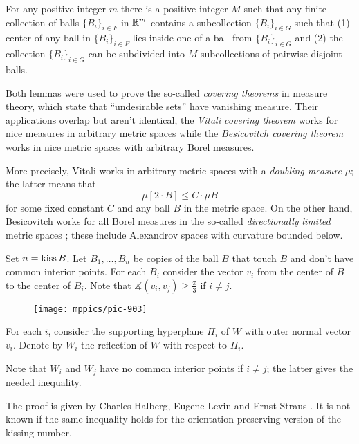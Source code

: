 \begin{pr}
For any positive integer $m$ there is a positive integer $M$ such that 
any finite collection of balls $\{B_i\}_{i\in F}$ in $\mathbb{R}^m$ 
contains a subcollection $\{B_i\}_{i\in G}$
such that (1) center of any ball in $\{B_i\}_{i\in F}$ lies inside one of a ball from $\{B_i\}_{i\in G}$
and (2) the collection $\{B_i\}_{i\in G}$ can be subdivided into $M$ subcollections of pairwise disjoint balls.
\end{pr}

Both lemmas were used to prove the so-called \emph{covering theorems} in measure theory,
which state that ``undesirable sets'' have vanishing measure.
Their applications overlap but aren't identical, the \emph{Vitali covering theorem} works for nice measures in arbitrary metric spaces while the \emph{Besicovitch covering theorem} works in nice metric spaces with arbitrary Borel measures.

More precisely, Vitali works in arbitrary metric spaces with a \emph{doubling measure} $\mu$;
the latter means that 
\[\mu [2\cdot B]\le C\cdot \mu B\] 
for some fixed constant $C$ and any ball $B$ in the metric space.
On the other hand, Besicovitch works for all Borel measures in the so-called \emph{directionally limited} metric spaces \cite[see 2.8.9 in][]{federer};
these include Alexandrov spaces with curvature bounded below.






Set $n=\mathop{\rm kiss} B$.
Let $B_1,\dots, B_n$ be copies of the ball $B$ that touch $B$ and don't have common interior points.
For each $B_i$ consider the vector $v_i$ from the center of $B$ to the center of $B_i$.
Note that $\measuredangle(v_i,v_j)\ge \tfrac\pi3$ if $i\ne j$.

\begin{wrapfigure}{r}{43 mm}
\vskip-0mm
\centering
\texttt{[image: mppics/pic-903]}
\end{wrapfigure}

For each $i$,
consider the supporting hyperplane $\Pi_i$
of $W$
with outer normal vector $v_i$.
Denote by $W_i$ the reflection of $W$ with respect to $\Pi_i$.

Note that $W_i$ and $W_j$ have no common interior points if $i\ne j$;
the latter gives the needed inequality.
\qeds



The proof is given by 
Charles Halberg, 
Eugene Levin 
and Ernst Straus 
\cite{halberg-levin-straus}.
It is not known if the same inequality holds for the orientation-preserving version of the kissing number.



